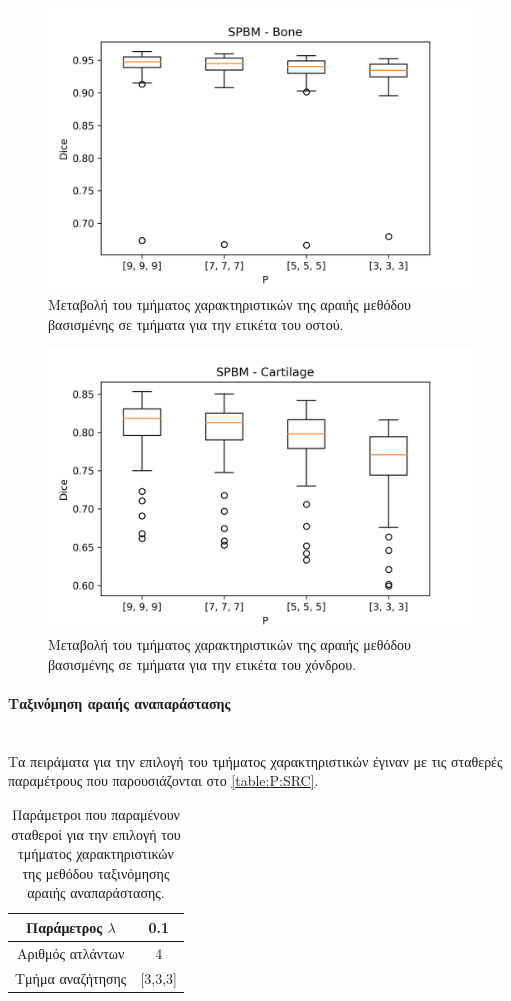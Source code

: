 \documentclass[a4paper,12pt]{article}
\newcommand{\paragraphLine}[1]{\paragraph{#1}\mbox{}\\}
\begin{document}
\begin{figure}[H]
    \centering
    \includegraphics[width=0.85\linewidth]{SPBM_P_Bone_plot.png}
    \caption{Μεταβολή του τμήματος χαρακτηριστικών της αραιής μεθόδου βασισμένης
             σε τμήματα για την ετικέτα του οστού.}
    \label{fig:SPBM:P:2}
\end{figure}

\begin{figure}[H]
    \centering
    \includegraphics[width=0.85\linewidth]{SPBM_P_Cartilage_plot.png}
    \caption{Μεταβολή του τμήματος χαρακτηριστικών της αραιής μεθόδου βασισμένης
             σε τμήματα για την ετικέτα του χόνδρου.}
    \label{fig:SPBM:P:3}
\end{figure}

\paragraphLine{Ταξινόμηση αραιής αναπαράστασης}

Τα πειράματα για την επιλογή του τμήματος χαρακτηριστικών έγιναν με τις σταθερές
παραμέτρους που παρουσιάζονται στο \autoref{table:P:SRC}.

\begin{table}[h!]
    \centering
    \begin{tabular}{|c|c|} 
        \hline
        Παράμετρος $\lambda$ & 0.1 \\ 
        \hline
        Αριθμός ατλάντων & 4 \\ 
        \hline
        Τμήμα αναζήτησης & [3,3,3] \\ 
        \hline
    \end{tabular}
    \caption{Παράμετροι που παραμένουν σταθεροί για την επιλογή του τμήματος
             χαρακτηριστικών της μεθόδου ταξινόμησης αραιής αναπαράστασης.}
    \label{table:P:SRC}
\end{table}
\end{document}
